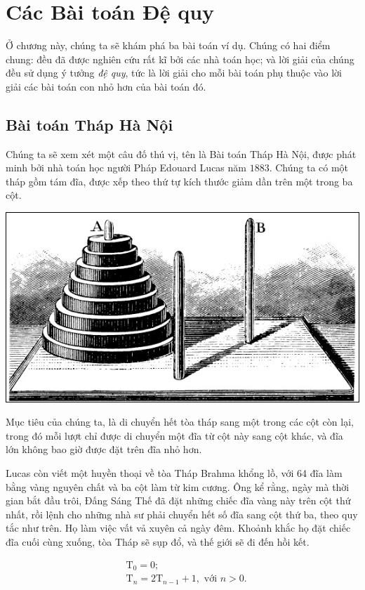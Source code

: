 \chapter{Các Bài toán Đệ quy}\label{ch:1}

Ở chương này, chúng ta sẽ khám phá ba bài toán ví dụ.
Chúng có hai điểm chung:
đều đã được nghiên cứu rất kĩ bởi các nhà toán học;
và lời giải của chúng đều sử dụng ý tưởng \textit{đệ quy}, tức là lời giải cho mỗi bài toán phụ thuộc vào lời giải các bài toán con nhỏ hơn của bài toán đó.

\section{Bài toán Tháp Hà Nội}\label{sec:1.1}


Chúng ta sẽ xem xét một câu đố thú vị, tên là Bài toán Tháp Hà Nội, được phát minh bởi nhà toán học người Pháp Edouard Lucas năm $1883$.
Chúng ta có một tháp gồm tám đĩa, được xếp theo thứ tự kích thước giảm dần trên một trong ba cột.

\begin{center}
    \includegraphics[width=.5\textwidth]{assets/chapter1/Tower of Hanoi}
\end{center}

Mục tiêu của chúng ta, là di chuyển hết tòa tháp sang một trong các cột còn lại, trong đó mỗi lượt chỉ được di chuyển một đĩa từ cột này sang cột khác, và đĩa lớn không bao giờ được đặt trên đĩa nhỏ hơn.


Lucas còn viết một huyền thoại về tòa Tháp Brahma khổng lồ, với 64 đĩa làm bằng vàng nguyên chất và ba cột làm từ kim cương.
Ông kể rằng, ngày mà thời gian bắt đầu trôi, Đấng Sáng Thế đã đặt những chiếc đĩa vàng này trên cột thứ nhất, rồi lệnh cho những nhà sư phải chuyển hết số đĩa sang cột thứ ba, theo quy tắc như trên.
Họ làm việc vất vả xuyên cả ngày đêm.
Khoảnh khắc họ đặt chiếc đĩa cuối cùng xuống, tòa Tháp sẽ sụp đổ, và thế giới sẽ đi đến hồi kết.

\begin{equation}\label{eq:1.1}
    \begin{aligned}
        & \mathrm{T}_0 = 0; \\
        & \mathrm{T}_n = 2 \mathrm{T}_{n - 1} + 1, \text{ với } n > 0.
    \end{aligned}
\end{equation}